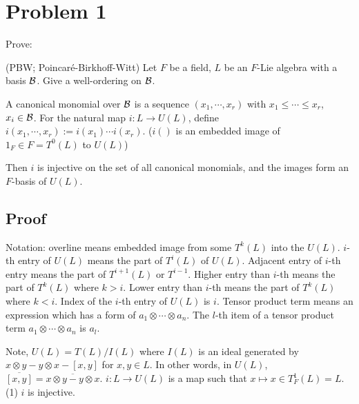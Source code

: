 \section*{Problem 1}

Prove:
\begin{theorem} (PBW; Poincar\'e-Birkhoff-Witt)
  Let
  \(F\) be a field,
  \(L\) be an \(F\)-Lie algebra with a basis \(\mathcal{B}\).
  Give a well-ordering on \(\mathcal{B}\).

  A canonical monomial over \(\mathcal{B}\) is a sequence \((x_1, \cdots, x_r)\)
  with \(x_1 \le \cdots \le x_r\), \(x_i \in \mathcal{B}\).
  For the natural map \(i: L \to U(L)\), define
  \(i(x_1, \cdots, x_r) := i(x_1) \cdots i(x_r)\).
  (\(i()\) is an embedded image of \(1_F \in F = T^0(L)\) to \(U(L)\))

  Then \(i\) is injective on the set of all canonical monomials,
  and the images form an \(F\)-basis of \(U(L)\).
\end{theorem}

\subsection*{Proof}

Notation: overline means embedded image from some \(T^k(L)\) into the \(U(L)\).
\(i\)-th entry of \(U(L)\) means the part of \(T^i(L)\) of \(U(L)\).
Adjacent entry of \(i\)-th entry means the part of \(T^{i+1}(L)\) or \(T^{i-1}\).
Higher entry than \(i\)-th means the part of \(T^{k}(L)\) where \(k > i\).
Lower entry than \(i\)-th means the part of \(T^{k}(L)\) where \(k < i\).
Index of the \(i\)-th entry of \(U(L)\) is \(i\).
Tensor product term means an expression which has a form of
\(a_1 \otimes \cdots \otimes a_n\).
The \(l\)-th item of a tensor product term \(a_1 \otimes \cdots \otimes a_n\)
is \(a_l\).

Note, \(U(L) = T(L) / I(L)\)
where \(I(L)\) is an ideal generated by \(x \otimes y - y \otimes x - [x, y]\) for \(x, y \in L\).
In other words, in \(U(L)\), \(\overline{[x, y]} = \overline{x \otimes y - y \otimes x}\).
\(i: L \to U(L)\) is a map such that \(x \mapsto x \in T_F^1(L) = L\).
\br
\noindent
(1) \(i\) is injective.

